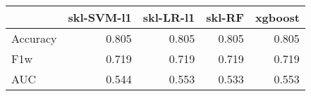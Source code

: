 \begin{tabular}{lrrrr}
\toprule
{} &  skl-SVM-l1 &  skl-LR-l1 &  skl-RF &  xgboost \\
\midrule
Accuracy &       0.805 &      0.805 &   0.805 &    0.805 \\
F1w      &       0.719 &      0.719 &   0.719 &    0.719 \\
AUC      &       0.544 &      0.553 &   0.533 &    0.553 \\
\bottomrule
\end{tabular}
